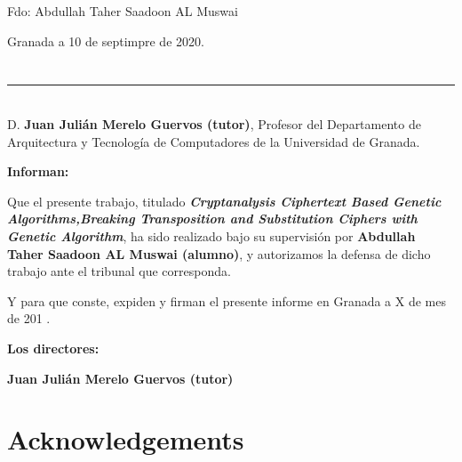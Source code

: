 \vspace{6cm}

\noindent Fdo: Abdullah Taher Saadoon AL Muswai

\vspace{2cm}

\begin{flushright}
Granada a 10 de septimpre de 2020.
\end{flushright}


\chapter*{}
\thispagestyle{empty}

\noindent\rule[-1ex]{\textwidth}{2pt}\\[4.5ex]

D. \textbf{ Juan Julián Merelo Guervos (tutor)}, Profesor del Departamento de Arquitectura y Tecnología de Computadores de la Universidad de Granada.

\vspace{0.5cm}



\vspace{0.5cm}

\textbf{Informan:}

\vspace{0.5cm}

Que el presente trabajo, titulado \textit{\textbf{Cryptanalysis Ciphertext Based Genetic Algorithms,Breaking Transposition and Substitution Ciphers with Genetic Algorithm}},
ha sido realizado bajo su supervisión por \textbf{Abdullah Taher Saadoon AL Muswai (alumno)}, y autorizamos la defensa de dicho trabajo ante el tribunal
que corresponda.

\vspace{0.5cm}

Y para que conste, expiden y firman el presente informe en Granada a X de mes de 201 .

\vspace{1cm}

\textbf{Los directores:}

\vspace{5cm}

\noindent \textbf{Juan Julián Merelo Guervos (tutor) \ \ }

\chapter*{Acknowledgements}
\thispagestyle{empty}

